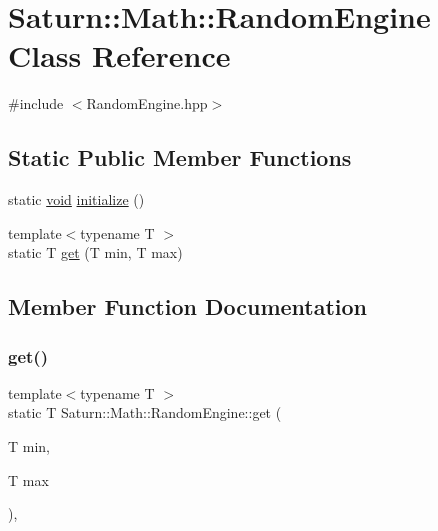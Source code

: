 \hypertarget{class_saturn_1_1_math_1_1_random_engine}{}\section{Saturn\+:\+:Math\+:\+:Random\+Engine Class Reference}
\label{class_saturn_1_1_math_1_1_random_engine}


{\ttfamily \#include $<$Random\+Engine.\+hpp$>$}

\subsection*{Static Public Member Functions}
\begin{DoxyCompactItemize}
\item 
static \mbox{\hyperlink{glad_8h_a950fc91edb4504f62f1c577bf4727c29}{void}} \mbox{\hyperlink{class_saturn_1_1_math_1_1_random_engine_a22ed5a73fe191681df0efe13998704de}{initialize}} ()
\item 
{\footnotesize template$<$typename T $>$ }\\static T \mbox{\hyperlink{class_saturn_1_1_math_1_1_random_engine_a93a5fc4ef76923daf98dd7482a7871ea}{get}} (T min, T max)
\end{DoxyCompactItemize}


\subsection{Member Function Documentation}
\mbox{\label{class_saturn_1_1_math_1_1_random_engine_a93a5fc4ef76923daf98dd7482a7871ea}} 
\subsubsection{\texorpdfstring{get()}{get()}}
{\footnotesize\ttfamily template$<$typename T $>$ \\
static T Saturn\+::\+Math\+::\+Random\+Engine\+::get (\begin{DoxyParamCaption}\item[{T}]{min,  }\item[{T}]{max }\end{DoxyParamCaption})\hspace{0.3cm}{\ttfamily [inline]}, {\ttfamily [static]}}

